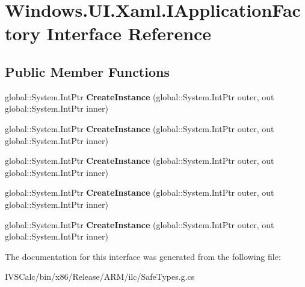 \hypertarget{interface_windows_1_1_u_i_1_1_xaml_1_1_i_application_factory}{}\section{Windows.\+U\+I.\+Xaml.\+I\+Application\+Factory Interface Reference}
\label{interface_windows_1_1_u_i_1_1_xaml_1_1_i_application_factory}
\subsection*{Public Member Functions}
\begin{DoxyCompactItemize}
\item 
\mbox{\label{interface_windows_1_1_u_i_1_1_xaml_1_1_i_application_factory_ac575707466b2fa85bf4cb7dcef5a0c5f}} 
global\+::\+System.\+Int\+Ptr {\bfseries Create\+Instance} (global\+::\+System.\+Int\+Ptr outer, out global\+::\+System.\+Int\+Ptr inner)
\item 
\mbox{\label{interface_windows_1_1_u_i_1_1_xaml_1_1_i_application_factory_ac575707466b2fa85bf4cb7dcef5a0c5f}} 
global\+::\+System.\+Int\+Ptr {\bfseries Create\+Instance} (global\+::\+System.\+Int\+Ptr outer, out global\+::\+System.\+Int\+Ptr inner)
\item 
\mbox{\label{interface_windows_1_1_u_i_1_1_xaml_1_1_i_application_factory_ac575707466b2fa85bf4cb7dcef5a0c5f}} 
global\+::\+System.\+Int\+Ptr {\bfseries Create\+Instance} (global\+::\+System.\+Int\+Ptr outer, out global\+::\+System.\+Int\+Ptr inner)
\item 
\mbox{\label{interface_windows_1_1_u_i_1_1_xaml_1_1_i_application_factory_ac575707466b2fa85bf4cb7dcef5a0c5f}} 
global\+::\+System.\+Int\+Ptr {\bfseries Create\+Instance} (global\+::\+System.\+Int\+Ptr outer, out global\+::\+System.\+Int\+Ptr inner)
\item 
\mbox{\label{interface_windows_1_1_u_i_1_1_xaml_1_1_i_application_factory_ac575707466b2fa85bf4cb7dcef5a0c5f}} 
global\+::\+System.\+Int\+Ptr {\bfseries Create\+Instance} (global\+::\+System.\+Int\+Ptr outer, out global\+::\+System.\+Int\+Ptr inner)
\end{DoxyCompactItemize}


The documentation for this interface was generated from the following file\+:\begin{DoxyCompactItemize}
\item 
I\+V\+S\+Calc/bin/x86/\+Release/\+A\+R\+M/ilc/Safe\+Types.\+g.\+cs\end{DoxyCompactItemize}
